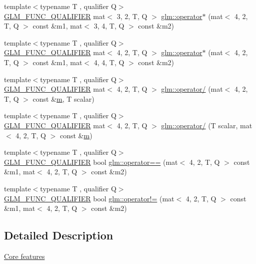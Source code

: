 \begin{DoxyCompactItemize}
\item 
{\footnotesize template$<$typename T , qualifier Q$>$ }\\\hyperlink{setup_8hpp_a33fdea6f91c5f834105f7415e2a64407}{G\+L\+M\+\_\+\+F\+U\+N\+C\+\_\+\+Q\+U\+A\+L\+I\+F\+I\+ER} mat$<$ 3, 2, T, Q $>$ \hyperlink{namespaceglm_aba08d8f9ada878e34444615572183029}{glm\+::operator$\ast$} (mat$<$ 4, 2, T, Q $>$ const \&m1, mat$<$ 3, 4, T, Q $>$ const \&m2)
\item 
{\footnotesize template$<$typename T , qualifier Q$>$ }\\\hyperlink{setup_8hpp_a33fdea6f91c5f834105f7415e2a64407}{G\+L\+M\+\_\+\+F\+U\+N\+C\+\_\+\+Q\+U\+A\+L\+I\+F\+I\+ER} mat$<$ 4, 2, T, Q $>$ \hyperlink{namespaceglm_ad8597c301e5b9d03f3933f7214b6cb6c}{glm\+::operator$\ast$} (mat$<$ 4, 2, T, Q $>$ const \&m1, mat$<$ 4, 4, T, Q $>$ const \&m2)
\item 
{\footnotesize template$<$typename T , qualifier Q$>$ }\\\hyperlink{setup_8hpp_a33fdea6f91c5f834105f7415e2a64407}{G\+L\+M\+\_\+\+F\+U\+N\+C\+\_\+\+Q\+U\+A\+L\+I\+F\+I\+ER} mat$<$ 4, 2, T, Q $>$ \hyperlink{namespaceglm_afd5ae9f406ff05c83abfb22b00960449}{glm\+::operator/} (mat$<$ 4, 2, T, Q $>$ const \&\hyperlink{_s_d_l__opengl__glext_8h_af593500c283bf1a787a6f947f503a5c2}{m}, T scalar)
\item 
{\footnotesize template$<$typename T , qualifier Q$>$ }\\\hyperlink{setup_8hpp_a33fdea6f91c5f834105f7415e2a64407}{G\+L\+M\+\_\+\+F\+U\+N\+C\+\_\+\+Q\+U\+A\+L\+I\+F\+I\+ER} mat$<$ 4, 2, T, Q $>$ \hyperlink{namespaceglm_af087abf561e6d907bf0d54f995def024}{glm\+::operator/} (T scalar, mat$<$ 4, 2, T, Q $>$ const \&\hyperlink{_s_d_l__opengl__glext_8h_af593500c283bf1a787a6f947f503a5c2}{m})
\item 
{\footnotesize template$<$typename T , qualifier Q$>$ }\\\hyperlink{setup_8hpp_a33fdea6f91c5f834105f7415e2a64407}{G\+L\+M\+\_\+\+F\+U\+N\+C\+\_\+\+Q\+U\+A\+L\+I\+F\+I\+ER} bool \hyperlink{namespaceglm_a218add00c8c3fd238c1589da83270f38}{glm\+::operator==} (mat$<$ 4, 2, T, Q $>$ const \&m1, mat$<$ 4, 2, T, Q $>$ const \&m2)
\item 
{\footnotesize template$<$typename T , qualifier Q$>$ }\\\hyperlink{setup_8hpp_a33fdea6f91c5f834105f7415e2a64407}{G\+L\+M\+\_\+\+F\+U\+N\+C\+\_\+\+Q\+U\+A\+L\+I\+F\+I\+ER} bool \hyperlink{namespaceglm_a3dda08fd1c305fc742d0ba9baf5cf9a3}{glm\+::operator!=} (mat$<$ 4, 2, T, Q $>$ const \&m1, mat$<$ 4, 2, T, Q $>$ const \&m2)
\end{DoxyCompactItemize}


\subsection{Detailed Description}
\hyperlink{group__core}{Core features} 